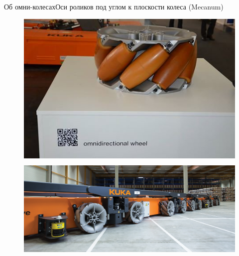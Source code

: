 \begin{frame}{Об омни-колесах}{Оси роликов под углом к плоскости колеса (Mecanum)}
    \vspace{10pt}
    \begin{figure}[H]
        \centering
        \begin{columns}
                \centering
                \includegraphics[width=\linewidth]{content/pic/photo/wheel_mecanum.jpg}
        \end{columns}
    \end{figure}
    \vspace{-55pt}
    \begin{figure}[H]
        \centering
        \begin{columns}
                \centering
                \includegraphics[width=\linewidth]{content/pic/photo/vehicle_kuka.png}
        \end{columns}
    \end{figure}
\end{frame}

\begin{frame}
  \tableofcontents
\end{frame}

